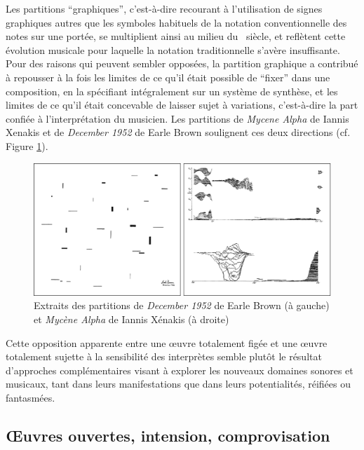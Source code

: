 \indent Les partitions ``graphiques'', c'est-à-dire recourant à l'utilisation de signes graphiques autres que les symboles habituels de la notation conventionnelle des notes sur une portée, se multiplient ainsi au milieu du ~siècle, et reflètent cette évolution musicale pour laquelle la notation traditionnelle s'avère insuffisante. Pour des raisons qui peuvent sembler opposées, la partition graphique a contribué à repousser à la fois les limites de ce qu'il était possible de ``fixer'' dans une composition, en la spécifiant intégralement sur un système de synthèse, et les limites de ce qu'il était concevable de laisser sujet à variations, c'est-à-dire la part confiée à l'interprétation du musicien. Les partitions de \textit{Mycene Alpha} de Iannis Xenakis et de \textit{December 1952} de Earle Brown soulignent ces deux directions (cf. Figure \ref{fig:notation:brown-xenakis}).

\begin{figure}[!htbp]
	\captionsetup{format=plain}
	\includegraphics[width=\textwidth]{gfx/notation/Brown-Xenakis-Paysage.png}
	\caption{Extraits des partitions de \textit{December 1952} de Earle Brown (à gauche) et \textit{Mycène Alpha} de Iannis Xénakis (à droite)}
	\label{fig:notation:brown-xenakis}
\end{figure}

\noindent Cette opposition apparente entre une œuvre totalement figée et une œuvre totalement sujette à la sensibilité des interprètes semble plutôt le résultat d'approches complémentaires visant à explorer les nouveaux domaines sonores et musicaux, tant dans leurs manifestations que dans leurs potentialités, réifiées ou fantasmées.

\subsection{Œuvres ouvertes, intension, comprovisation}

